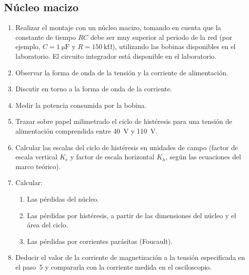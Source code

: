 \subsection{Núcleo macizo}
\begin{enumerate}
    \item Realizar el montaje con un núcleo macizo, tomando en cuenta que la constante de tiempo $RC$ debe ser muy superior al periodo de la red (por ejemplo, $C = \SI{1}{\micro\farad}$ y $R = \SI{150}{\kilo\ohm}$), utilizando las bobinas disponibles en el laboratorio. El circuito integrador está disponible en el laboratorio.
    \item Observar la forma de onda de la tensión y la corriente de alimentación.
    \item Discutir en torno a la forma de onda de la corriente.
    \item Medir la potencia consumida por la bobina.
    \item Trazar sobre papel milimetrado el ciclo de histéresis para una tensión de alimentación comprendida entre \SI{40}{V} y \SI{110}{V}.
    \item Calcular las escalas del ciclo de histéresis en unidades de campo (factor de escala vertical $K_v$ y factor de escala horizontal $K_h$, según las ecuaciones del marco teórico).
    \item Calcular:
          \begin{enumerate}
              \item Las pérdidas del núcleo.
              \item Las pérdidas por histéresis, a partir de las dimensiones del núcleo y el área del ciclo.
              \item Las pérdidas por corrientes parásitas (Foucault).
          \end{enumerate}
    \item Deducir el valor de la corriente de magnetización a la tensión especificada en el paso~5 y compararla con la corriente medida en el osciloscopio.
\end{enumerate}


